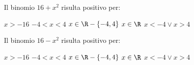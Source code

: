 \begin{esercizio}
\label{ese:4.24}
Il binomio \(16+x^2\) risulta positivo per:

\; \(x>-16\)\quad {}\; \(-4<x<4\) \quad{}\; \(x\in 
\R-\{-4,4\}\) 
\quad{}\; \(x\in \R\) \quad{}\; \(x<-4\vee x>4\)
\end{esercizio}

\begin{esercizio}
\label{ese:4.25}
Il binomio \(16-x^2\) risulta positivo per:

\; \(x>-16\)\quad {}\; \(-4<x<4\) \quad{}\; \(x\in 
\R-\{-4,4\}\) 
\quad{}\; \(x\in \R\) \quad{}\; \(x<-4\vee x>4\)
\end{esercizio}


